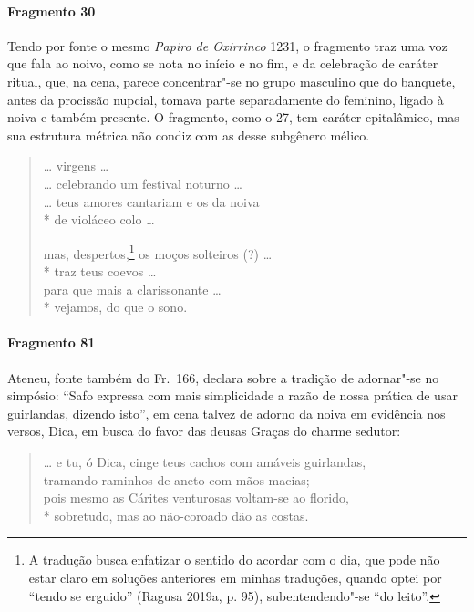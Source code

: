 \paragraph{Fragmento 30}

{\small Tendo por fonte o mesmo \textit{Papiro de Oxirrinco} 1231, o fragmento traz uma
voz que fala ao noivo, como se nota no início e no fim, e da celebração de
caráter ritual, que, na cena, parece concentrar"-se no grupo masculino que do
banquete, antes da procissão nupcial, tomava parte separadamente do feminino,
ligado à noiva e também presente. O fragmento, como o 27, tem caráter
epitalâmico, mas sua estrutura métrica não condiz com as desse subgênero
mélico.}

\begin{verse}
\ldots{} virgens \ldots{}\\
\ldots{} celebrando um festival noturno \ldots{}\\
\ldots{} teus amores cantariam e os da noiva\\*
de violáceo colo \ldots{}

mas, despertos,\footnote{A tradução busca enfatizar o sentido do acordar com o dia, que pode não estar claro em soluções anteriores em minhas traduções, quando optei por ``tendo se erguido'' (Ragusa 2019a, p. 95), subentendendo"-se ``do leito''.} os moços solteiros (?) \ldots{}\\*
traz teus coevos  \ldots{}\\
para que mais a clarissonante \ldots{}\\*
vejamos, do que o sono.
\end{verse}

\paragraph{Fragmento 81}

{\small Ateneu, fonte também do Fr.~166, declara sobre a tradição de adornar"-se no
simpósio: ``Safo expressa com mais simplicidade a razão de nossa prática
de usar guirlandas, dizendo isto”, em cena talvez de adorno da noiva em evidência nos versos, Dica, em busca do favor das deusas Graças do charme sedutor:}

\begin{verse}
\ldots{} e tu, ó Dica, cinge teus cachos com amáveis \qb{}guirlandas,\\
tramando raminhos de aneto com mãos \qb{}macias;\\
pois mesmo as Cárites venturosas voltam-se \qb{}ao florido,\\*
sobretudo, mas ao não-coroado dão as costas.
\end{verse}


